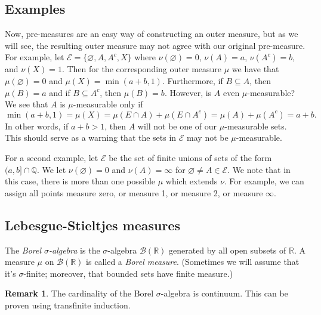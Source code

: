 \documentclass{article}
\theoremstyle{definition}
\newtheorem{remark}[theorem]{Remark}
\begin{document}
\subsection{Examples}

Now, pre-measures are an easy way of constructing an outer measure, but as
    we will see, the resulting outer measure may not agree with our original pre-measure.
    For example, 
    let \( \mathcal{E} = \{ \varnothing, A, A^c , X \} \) where \(
    \nu(\varnothing)
    = 0 \), \( \nu(A) = a \), \( \nu(A^c) = b \), and \( \nu(X) = 1 \). Then for
    the
    corresponding outer measure \(\mu\) we have that \( \mu(\varnothing) = 0 \)
    and \(
    \mu(X) = \min(a + b, 1) \). Furthermore, if \( B \subseteq A \), then \( \mu(B) = a \)
    and if \( B \subseteq A^c \), then \( \mu(B) = b \). However, is \( A \)
    even \(\mu\)-measurable? We see that \( A \) is \(\mu\)-measurable only if
    \begin{displaymath}
        \min(a + b,1) = \mu(X) = \mu(E \cap A) + \mu(E \cap A^c) = \mu(A)
        + \mu(A^c) = a + b.
    \end{displaymath}
    In other words, if \( a + b > 1 \), then \( A \) will not be one of our
    \(\mu\)-measurable sets. This should serve as a warning that the sets in \( \mathcal{E} \) may not be
    \(\mu\)-measurable.

    For a second example, let \( \mathcal{E} \) be the set of finite unions of
    sets of the form \( (a,b] \cap \mathbb{Q} \). We let \( \nu(\varnothing) =
    0 \) and \( \nu(A) = \infty \) for \( \varnothing \neq A \in \mathcal{E} \).
    We note that in this case, there is more than one possible \(\mu\) which
    extends
    \( \nu \). For example, we can assign all
    points measure zero, or measure 1, or measure 2, or measure $\infty$.

\subsection{Lebesgue-Stieltjes measures}

The \emph{Borel \(\sigma\)-algebra} is the \(\sigma\)-algebra \( \mathcal{B}(\mathbb{R}) \)
generated by all open subsets of \(\mathbb{R}\). A measure $\mu$
on \( \mathcal{B}(\mathbb{R}) \) is called a \emph{Borel measure}.
(Sometimes we will assume that it's $\sigma$-finite; moreover,
that bounded sets have finite measure.)

\begin{remark}
    The cardinality of the Borel $\sigma$-algebra is 
    continuum. This can be proven using transfinite induction.
\end{remark}
\end{document}
